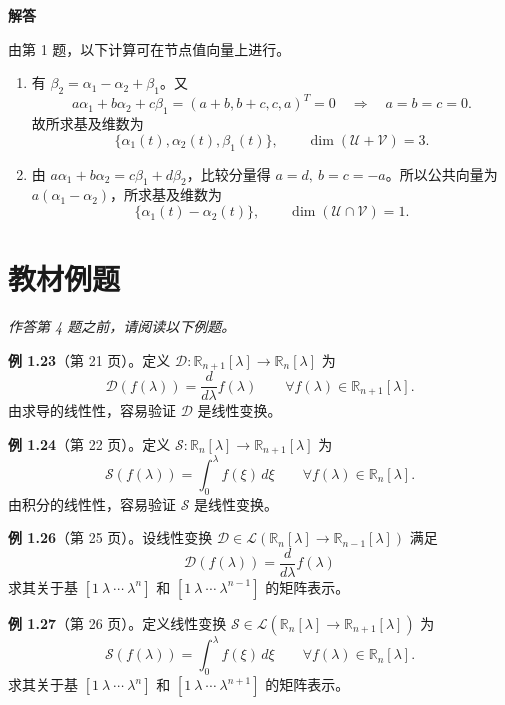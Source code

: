 \documentclass[UTF8,10pt,letterpaper,fontset=fandol]{ctexart}
\newcommand{\R}{\mathbb R}
\newcommand{\Solution}{\par\Needspace{5\baselineskip}\textbf{解答}\par}
\begin{document}
\Solution
由第 1 题，以下计算可在节点值向量上进行。
\begin{enumerate}
\item 有 \(\beta_2=\alpha_1-\alpha_2+\beta_1\)。又
\[
a\alpha_1+b\alpha_2+c\beta_1
=(a+b,b+c,c,a)^T=0\quad\Longrightarrow\quad a=b=c=0.
\]
故所求基及维数为
\[
\boxed{\{\alpha_1(t),\alpha_2(t),\beta_1(t)\}},\qquad
\boxed{\dim(\mathcal U+\mathcal V)=3}.
\]
\item 由 \(a\alpha_1+b\alpha_2=c\beta_1+d\beta_2\)，比较分量得
\(a=d,\ b=c=-a\)。所以公共向量为 \(a(\alpha_1-\alpha_2)\)，所求基及维数为
\[
\boxed{\{\alpha_1(t)-\alpha_2(t)\}},\qquad
\boxed{\dim(\mathcal U\cap\mathcal V)=1}.
\]
\end{enumerate}

\section{教材例题}
\emph{作答第 4 题之前，请阅读以下例题。}

\textbf{例 1.23}（第 21 页）。定义 \(\mathcal D:\R_{n+1}[\lambda]\to\R_n[\lambda]\) 为
\[
\mathcal D(f(\lambda))=\frac{d}{d\lambda}f(\lambda)
\qquad\forall f(\lambda)\in\R_{n+1}[\lambda].
\]
由求导的线性性，容易验证 \(\mathcal D\) 是线性变换。

\textbf{例 1.24}（第 22 页）。定义 \(\mathcal S:\R_n[\lambda]\to\R_{n+1}[\lambda]\) 为
\[
\mathcal S(f(\lambda))=\int_0^\lambda f(\xi)\,d\xi
\qquad\forall f(\lambda)\in\R_n[\lambda].
\]
由积分的线性性，容易验证 \(\mathcal S\) 是线性变换。

\begin{samepage}
\textbf{例 1.26}（第 25 页）。设线性变换
\(\mathcal D\in\mathcal L(\R_n[\lambda]\to\R_{n-1}[\lambda])\) 满足
\[
\mathcal D(f(\lambda))=\frac{d}{d\lambda}f(\lambda)
\]
求其关于基 \([1\ \lambda\ \cdots\ \lambda^n]\) 和
\([1\ \lambda\ \cdots\ \lambda^{n-1}]\) 的矩阵表示。
\end{samepage}

\textbf{例 1.27}（第 26 页）。定义线性变换
\(\mathcal S\in\mathcal L(\R_n[\lambda]\to\R_{n+1}[\lambda])\) 为
\[
\mathcal S(f(\lambda))=\int_0^\lambda f(\xi)\,d\xi
\qquad\forall f(\lambda)\in\R_n[\lambda].
\]
求其关于基 \([1\ \lambda\ \cdots\ \lambda^n]\) 和
\([1\ \lambda\ \cdots\ \lambda^{n+1}]\) 的矩阵表示。
\end{document}
